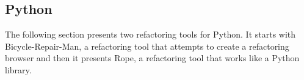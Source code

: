 \subsection{Python}

The following section presents two refactoring tools for Python. 
It starts with Bicycle-Repair-Man, a refactoring tool that attempts to create a refactoring browser and then it presents Rope, a refactoring tool that works like a Python library.


